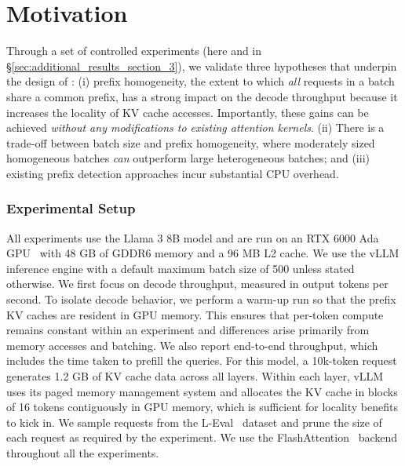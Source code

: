 \vspace{-5pt}

\section{Motivation}
\label{sec:motivation}
Through a set of controlled experiments (here and in \S\ref{sec:additional_results_section_3}), we validate three hypotheses that underpin the design of \Feather: (i) prefix homogeneity, the extent to which \textit{all} requests in a batch share a common prefix, has a strong impact on the decode throughput because it increases the locality of KV cache accesses. Importantly, these gains can be achieved \textit{without any modifications to existing attention kernels}. (ii) There is a trade-off between batch size and prefix homogeneity, where moderately sized homogeneous batches \textit{can} outperform large heterogeneous batches; and (iii) existing prefix detection approaches incur substantial CPU overhead. 

\vspace{-5pt}

\subsubsection*{Experimental Setup} 
All experiments use the Llama 3 8B \cite{llama3modelcard} model and are run on an RTX 6000 Ada GPU~\cite{nvidia_rtx6000_datasheet} with 48 GB of GDDR6 memory and a 96 MB L2 cache. We use the vLLM \cite{kwon2023efficient} inference engine with a default maximum batch size of 500 unless stated otherwise. We first focus on decode throughput, measured in output tokens per second. To isolate decode behavior, we perform a warm-up run so that the prefix KV caches are resident in GPU memory. This ensures that per-token compute remains constant within an experiment and differences arise primarily from memory accesses and batching. We also report end-to-end throughput, which includes the time taken to prefill the queries. For this model, a 10k-token request generates 1.2 GB of KV cache data across all layers. Within each layer, vLLM uses its paged memory management system and allocates the KV cache in blocks of 16 tokens contiguously in GPU memory, which is sufficient for locality benefits to kick in. We sample requests from the L-Eval~\cite{an2023leval} dataset and prune the size of each request as required by the experiment. We use the FlashAttention~\cite{dao2022flashattentionfastmemoryefficientexact} backend throughout all the experiments.

